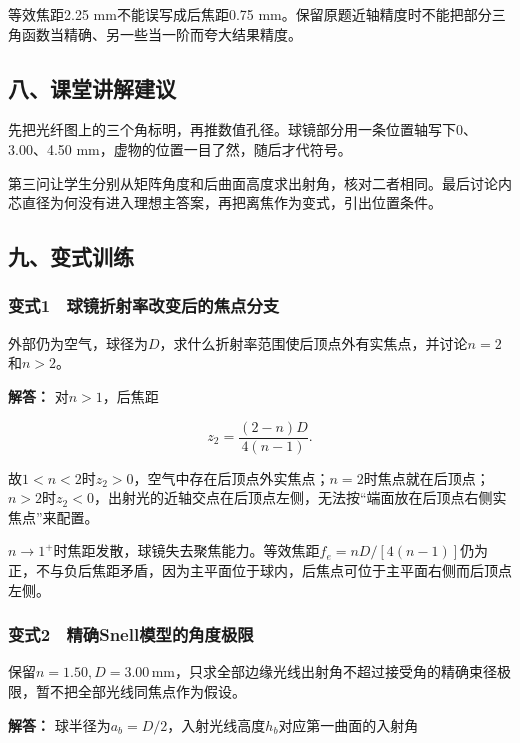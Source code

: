 \documentclass[12pt,a4paper,fontset=fandol]{ctexart}
\begin{document}
等效焦距2.25 mm不能误写成后焦距0.75
mm。保留原题近轴精度时不能把部分三角函数当精确、另一些当一阶而夸大结果精度。

\subsection{八、课堂讲解建议}\label{ux516bux8bfeux5802ux8bb2ux89e3ux5efaux8bae-4}

先把光纤图上的三个角标明，再推数值孔径。球镜部分用一条位置轴写下0、3.00、4.50
mm，虚物的位置一目了然，随后才代符号。

第三问让学生分别从矩阵角度和后曲面高度求出射角，核对二者相同。最后讨论内芯直径为何没有进入理想主答案，再把离焦作为变式，引出位置条件。

\subsection{九、变式训练}\label{ux4e5dux53d8ux5f0fux8badux7ec3-4}

\subsubsection{变式1　球镜折射率改变后的焦点分支}\label{ux53d8ux5f0f1-ux7403ux955cux6298ux5c04ux7387ux6539ux53d8ux540eux7684ux7126ux70b9ux5206ux652f}

外部仍为空气，球径为\(D\)，求什么折射率范围使后顶点外有实焦点，并讨论\(n=2\)和\(n>2\)。

\textbf{解答：} 对\(n>1\)，后焦距

\[
z_2=\frac{(2-n)D}{4(n-1)}.
\]

故\(1<n<2\)时\(z_2>0\)，空气中存在后顶点外实焦点；\(n=2\)时焦点就在后顶点；\(n>2\)时\(z_2<0\)，出射光的近轴交点在后顶点左侧，无法按``端面放在后顶点右侧实焦点''来配置。

\(n\to1^+\)时焦距发散，球镜失去聚焦能力。等效焦距\(f_e=nD/[4(n-1)]\)仍为正，不与负后焦距矛盾，因为主平面位于球内，后焦点可位于主平面右侧而后顶点左侧。

\subsubsection{变式2　精确Snell模型的角度极限}\label{ux53d8ux5f0f2-ux7cbeux786esnellux6a21ux578bux7684ux89d2ux5ea6ux6781ux9650}

保留\(n=1.50,D=3.00\,\mathrm{mm}\)，只求全部边缘光线出射角不超过接受角的精确束径极限，暂不把全部光线同焦点作为假设。

\textbf{解答：}
球半径为\(a_b=D/2\)，入射光线高度\(h_b\)对应第一曲面的入射角
\end{document}
